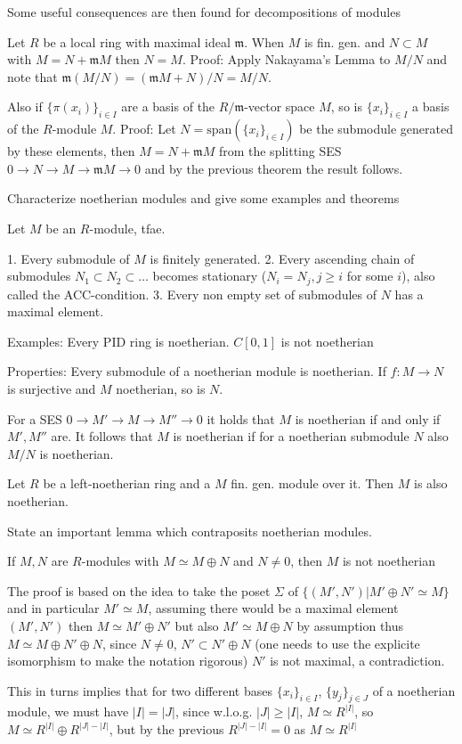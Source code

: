 Some useful consequences are then found for decompositions of modules

Let \(R\) be a local ring with maximal ideal \(\mathfrak{m}\). When \(M\) is fin. gen. and \(N \subset M\) with \(M = N + \mathfrak{m}M\) then \(N = M\).
Proof: Apply Nakayama's Lemma to \(M/N\) and note that \(\mathfrak{m}(M/N) = (\mathfrak{m}M + N)/N = M/N\).

Also if \(\{\pi(x_i)\}_{i \in I}\) are a basis of the \(R/\mathfrak{m}\)-vector space \(M\), so is \(\{x_i\}_{i \in I}\) a basis of the \(R\)-module \(M\).
Proof: Let \(N = \text{span}(\{x_i\}_{i \in I})\) be the submodule generated by these elements, then \(M = N + \mathfrak{m}M\) from the splitting SES \(0 \to N \to M \to \mathfrak{m}M \to 0\) 
and by the previous theorem the result follows.


Characterize noetherian modules
and give some examples and theorems

Let \(M\) be an \(R\)-module, tfae.

1. Every submodule of \(M\) is finitely generated.
2. Every ascending chain of submodules \(N_1 \subset N_2 \subset \dots\) becomes stationary (\(N_i = N_j, j \geq i\) for some \(i\)), also called the ACC-condition.
3. Every non empty set of submodules of \(N\) has a maximal element.

Examples:
Every PID ring is noetherian. \(C[0, 1]\) is not noetherian 

Properties:
Every submodule of a noetherian module is noetherian.
If \(f : M \to N\) is surjective and \(M\) noetherian, so is \(N\).

For a SES \(0 \to M' \to M \to M'' \to 0\) it holds that \(M\) is noetherian if and only if \(M', M''\) are.
It follows that \(M\) is noetherian if for a noetherian submodule \(N\) also \(M/N\) is noetherian.

Let \(R\) be a left-noetherian ring and a \(M\) fin. gen. module over it. Then \(M\) is also noetherian.

State an important lemma which contraposits noetherian modules.

If \(M, N\) are \(R\)-modules with \(M \simeq M \oplus N\) and \(N \neq 0\), then \(M\) is not noetherian

The proof is based on the idea to take the poset \(\Sigma\) of \(\{ (M', N') | M' \oplus N' \simeq M \}\) and in particular
\(M' \simeq M\), assuming there would be a maximal element \((M', N')\) then \(M \simeq M' \oplus N'\) but also \(M' \simeq M \oplus N\) by assumption
thus \(M \simeq M \oplus N' \oplus N\), since \(N \neq 0\), \(N' \subset N' \oplus N\) (one needs to use the explicite isomorphism to make the notation rigorous)
\(N'\) is not maximal, a contradiction.

This in turns implies that for two different bases \(\{x_i\}_{i \in I}\), \(\{y_j\}_{j \in J}\) of a noetherian module, we must have \(|I| = |J|\),
since w.l.o.g. \(|J| \geq |I|\), \(M \simeq R^{|I|}\), so \(M \simeq R^{|I|} \oplus R^{|J| - |I|}\), but by the previous \(R^{|J| - |I|} = 0\)
as \(M \simeq R^{|I|}\)

